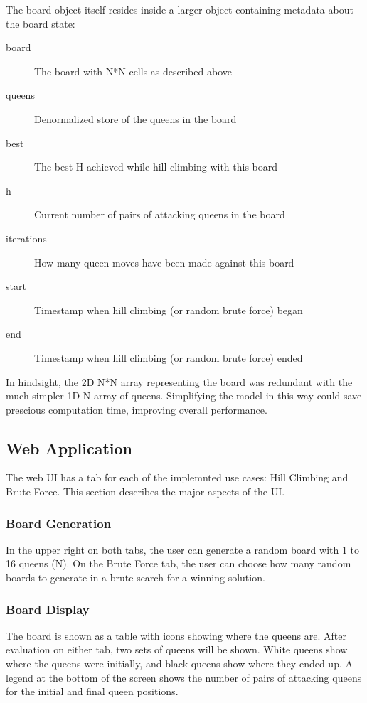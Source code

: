 The board object itself resides inside a larger object containing metadata about the board state:

\begin{description}
\item[board] The board with N*N cells as described above
\item[queens] Denormalized store of the queens in the board
\item[best] The best H achieved while hill climbing with this board
\item[h] Current number of pairs of attacking queens in the board
\item[iterations] How many queen moves have been made against this board
\item[start] Timestamp when hill climbing (or random brute force)  began
\item[end] Timestamp when hill climbing (or random brute force) ended
\end{description}

In hindsight, the 2D N*N array representing the board was redundant with the much simpler 1D N array of queens.
Simplifying the model in this way could save prescious computation time, improving overall performance.

\subsection{Web Application}
The web UI has a tab for each of the implemnted use cases: Hill Climbing and Brute Force. This section describes the
major aspects of the UI.

\subsubsection{Board Generation}
In the upper right on both tabs, the user can generate a random board with 1 to 16 queens (N). On the Brute Force tab,
the user can choose how many random boards to generate in a brute search for a winning solution.

\subsubsection{Board Display}
The board is shown as a table with icons showing where the queens are. After evaluation on either tab, two sets of
queens will be shown. White queens show where the queens were initially, and black queens show where they ended up.
A legend at the bottom of the screen shows the number of pairs of attacking queens for the initial and final queen
positions.



